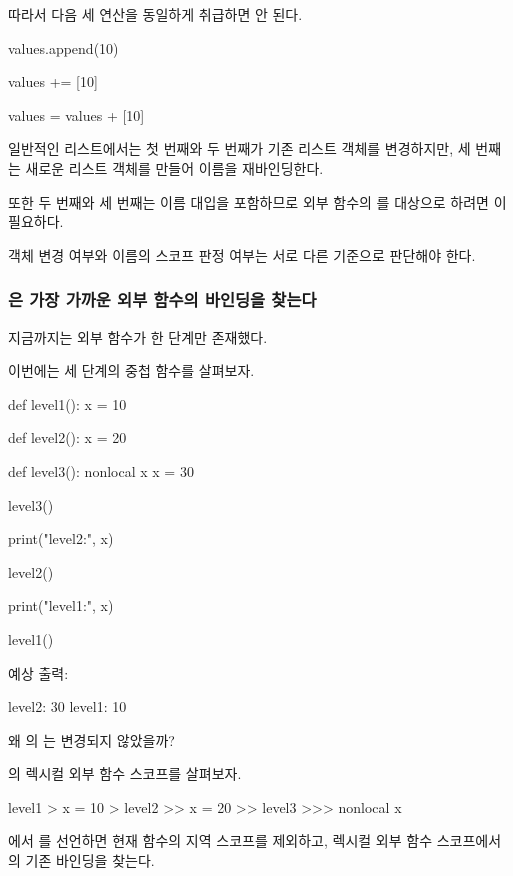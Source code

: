 따라서 다음 세 연산을 동일하게 취급하면 안 된다.

\begin{dhkcode}
values.append(10)

values += [10]

values = values + [10]
\end{dhkcode}

일반적인 리스트에서는 첫 번째와 두 번째가 기존 리스트 객체를 변경하지만, 세 번째는 새로운 리스트 객체를 만들어 이름을 재바인딩한다.

또한 두 번째와 세 번째는 이름 대입을 포함하므로 외부 함수의 를 대상으로 하려면 이 필요하다.

객체 변경 여부와 이름의 스코프 판정 여부는 서로 다른 기준으로 판단해야 한다.

\subsubsection{은 가장 가까운 외부 함수의 바인딩을 찾는다}

지금까지는 외부 함수가 한 단계만 존재했다.

이번에는 세 단계의 중첩 함수를 살펴보자.

\begin{dhkcode}
def level1():
    x = 10

    def level2():
        x = 20

        def level3():
            nonlocal x
            x = 30

        level3()

        print("level2:", x)

    level2()

    print("level1:", x)


level1()
\end{dhkcode}

예상 출력:

\begin{dhkzsh}
level2: 30
level1: 10
\end{dhkzsh}

왜 의 는 변경되지 않았을까?

의 렉시컬 외부 함수 스코프를 살펴보자.

\begin{dhkdir}[in=6]
level1
> x = 10
> level2
>> x = 20
>> level3
>>> nonlocal x
\end{dhkdir}

에서 를 선언하면 현재 함수의 지역 스코프를 제외하고, 렉시컬 외부 함수 스코프에서 의 기존 바인딩을 찾는다.


